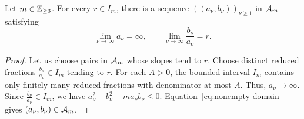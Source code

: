 \begin{lemma}\label{lem:approaching-sequence}
Let $m\in\mathbb Z_{\ge3}$.
For every $r\in I_m$, there is a sequence $((a_\nu,b_\nu))_{\nu\ge1}$ in $\mathcal A_m$ satisfying
\begin{equation}\label{eq:approaching-sequence}
 \lim_{\nu\to\infty}a_\nu=\infty,\qquad
 \lim_{\nu\to\infty}\frac{b_\nu}{a_\nu}=r.
\end{equation}
\end{lemma}
\begin{proof}
Let us choose pairs in $\mathcal A_m$ whose slopes tend to $r$.
Choose distinct reduced fractions $\frac{b_\nu}{a_\nu}\in I_m$ tending to $r$.
For each $A>0$, the bounded interval $I_m$ contains only finitely many reduced
fractions with denominator at most $A$. Thus, $a_\nu\to\infty$.
Since $\frac{b_\nu}{a_\nu}\in I_m$, we have
$a_\nu^2+b_\nu^2-ma_\nu b_\nu\le0$.
Equation~\eqref{eq:nonempty-domain} gives $(a_\nu,b_\nu)\in\mathcal A_m$.
\end{proof}

